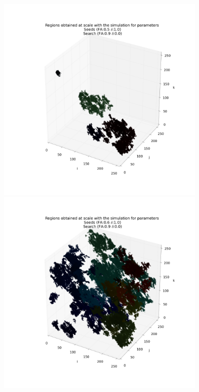 \documentclass[12pt]{article}
\begin{document}
\begin{figure}[ht]
\centering
\begin{minipage}{.45\textwidth}
  \centering
  \includegraphics[width=0.9\textwidth]{groups/3d/seeds_FA_5/regions_nonoise_seeds_FA_05_Trace_10_search_FA_09_Trace_00_.png}
\end{minipage}%
\begin{minipage}{.45\textwidth}
  \centering
  \includegraphics[width=0.9\textwidth]{groups/3d/seeds_FA_6/regions_nonoise_seeds_FA_06_Trace_10_search_FA_09_Trace_00_.png}

\end{minipage}
\end{figure}
\end{document}
